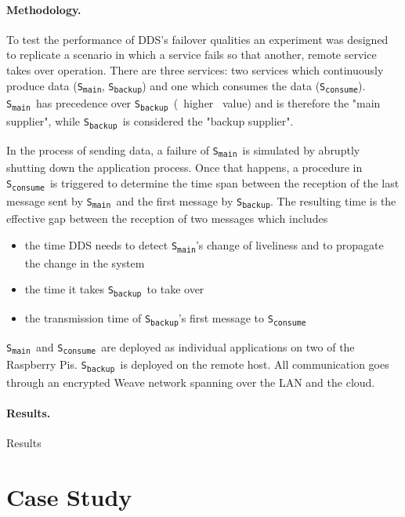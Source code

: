 \newcommand{\proda}{\texttt{S\textsubscript{main}}}
\newcommand{\prodb}{\texttt{S\textsubscript{backup}}}
\newcommand{\cons}{\texttt{S\textsubscript{consume}}}

\paragraph{Methodology.} To test the performance of DDS's failover qualities an experiment was designed to replicate a scenario in which a service fails so that another, remote service takes over operation. There are three services: two services which continuously produce data (\proda , \prodb) and one which consumes the data (\cons). \proda\ has precedence over \prodb\ (\ie\ higher \ownership\ value) and is therefore the "main supplier", while \prodb\ is considered the "backup supplier". 

In the process of sending data, a failure of \proda\ is simulated by abruptly shutting down the application process. Once that happens, a procedure in \cons\ is triggered to determine the time span between the reception of the last message sent by \proda\ and the first message by \prodb . The resulting time is the effective gap between the reception of two messages which includes
\begin{itemize}
  \item the time DDS needs to detect \proda 's change of liveliness and to propagate the change in the system
  \item the time it takes \prodb\ to take over
  \item the transmission time of \prodb 's first message to \cons
\end{itemize} 

\proda\ and \cons\ are deployed as individual applications on two of the Raspberry Pis. \prodb\ is deployed on the remote host. All communication goes through an encrypted Weave network spanning over the LAN and the cloud.




\paragraph{Results.} Results

%
%
%
%
%
%
%
%
%
%

\section{Case Study}


